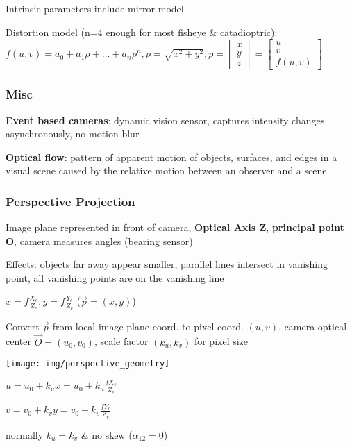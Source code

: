 \documentclass[fontsize=6pt]{scrartcl}
\begin{document}
\begin{multicols*}{4}
Intrinsic parameters include mirror model

Distortion model (n=4 enough for most fisheye \& catadioptric): $f(u,v)=a_0+a_1 \rho+\ldots+a_n
\rho^n, \rho=\sqrt{x^2 + y^2}, p=\begin{bmatrix}x\\y\\z\end{bmatrix}=\begin{bmatrix}u\\v\\f(u,v)\end{bmatrix}$
\subsubsection*{Misc}
\textbf{Event based cameras}: dynamic vision sensor, captures intensity changes asynchronously, no motion blur

\textbf{Optical flow}: pattern of apparent motion of objects, surfaces, and edges in a visual scene caused by the relative motion between an observer and a scene.

\subsubsection*{Perspective Projection}
Image plane represented in front of camera, \textbf{Optical Axis Z}, \textbf{principal point O}, camera measures angles (bearing sensor)

Effects: objects far away appear smaller, parallel lines intersect in vanishing point, all vanishing points are on the vanishing line


$x = f \frac{X_c}{Z_c}, y = f \frac{Y_c}{Z_c}$ ($\vec p = (x,y)$)

Convert $\vec{p}$ from local image plane coord. to pixel coord. $(u,v)$, camera optical center $\vec{O} = (u_0,v_0)$, scale factor $(k_u, k_v)$ for pixel size

\begin{minipage}{0.45\linewidth}
	\texttt{[image: img/perspective\_geometry]}
\end{minipage}
\begin{minipage}{0.55\linewidth}
	$u = u_0 + k_u x = u_0 + k_u \frac{fX_c}{Z_c}$

	$v = v_0 + k_v y = v_0 + k_v \frac{fY_c}{Z_c}$

	normally $k_u = k_v$ \& no skew ($\alpha_{12} = 0$)
\end{minipage}


\end{multicols*}
\end{document}
